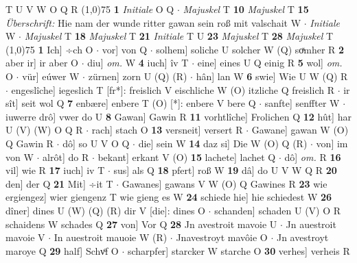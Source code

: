 \documentclass[8pt,a4paper,notitlepage]{article}
\begin{document}
\begin{table}[ht]
\begin{minipage}[t]{0.5\linewidth}
T U V W O Q R \newline
\line(1,0){75} \newline
\textbf{1} \textit{Initiale} O Q   $\cdot$ \textit{Majuskel} T  \textbf{10} \textit{Majuskel} T  \textbf{15} \textit{Überschrift:} Hie nam der wunde ritter gawan sein roß mit valschait W   $\cdot$ \textit{Initiale} W   $\cdot$ \textit{Majuskel} T  \textbf{18} \textit{Majuskel} T  \textbf{21} \textit{Initiale} T U  \textbf{23} \textit{Majuskel} T  \textbf{28} \textit{Majuskel} T  \newline
\line(1,0){75} \newline
\textbf{1} Ich] ÷ch O  $\cdot$ vor] von Q  $\cdot$ solhem] soliche U solcher W (Q) soͯmher R \textbf{2} aber ir] ir aber O  $\cdot$ diu] \textit{om.} W \textbf{4} iuch] îv T  $\cdot$ eine] eines U Q einig R \textbf{5} wol] \textit{om.} O  $\cdot$ vür] eúwer W  $\cdot$ zürnen] zorn U (Q) (R)  $\cdot$ hân] lan W \textbf{6} swie] Wie U W (Q) R  $\cdot$ engeslîche] iegeslich T [fr*]: freislich V eischliche W (O) itzliche Q freislich R  $\cdot$ ir sît] seit wol Q \textbf{7} enbære] enbere T (O) [*]: enbere  V bere Q  $\cdot$ sanfte] senffter W  $\cdot$ iuwerre drô] vwer do U \textbf{8} Gawan] Gawin R \textbf{11} vorhtlîche] Frolichen Q \textbf{12} hût] har U (V) (W) O Q R  $\cdot$ rach] stach O \textbf{13} versneit] versert R  $\cdot$ Gawane] gawan W (O) Q Gawin R  $\cdot$ dô] so U V O Q  $\cdot$ die] sein W \textbf{14} daz si] Die W (O) Q (R)  $\cdot$ von] im von W  $\cdot$ alrôt] do R  $\cdot$ bekant] erkant V (O) \textbf{15} lachete] lachet Q  $\cdot$ dô] \textit{om.} R \textbf{16} vil] wie R \textbf{17} iuch] iv T  $\cdot$ sus] als Q \textbf{18} pfert] roß W \textbf{19} dâ] do U V W Q R \textbf{20} den] der Q \textbf{21} Mit] ÷it T  $\cdot$ Gawanes] gawans V W (O) Q Gawines R \textbf{23} wie ergiengez] wier giengenz T wie gieng es W \textbf{24} schiede hie] hie schiedest W \textbf{26} dîner] dines U (W) (Q) (R) dir V [die]: dines O  $\cdot$ schanden] schaden U (V) O R schaidens W schades Q \textbf{27} von] Vor Q \textbf{28} Jn avestroit mavoie U  $\cdot$ Jn auestroit mavoie V  $\cdot$ In auestroit mauoie W (R)  $\cdot$ Jnavestroyt mavôie O  $\cdot$ Jn avestroyt maroye Q \textbf{29} half] Schvͦf O  $\cdot$ scharpfer] starcker W starche O \textbf{30} verhes] verheis R \newline
\end{minipage}
\end{table}
\end{document}
